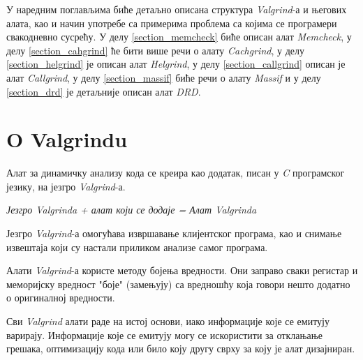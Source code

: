 \documentclass[12pt,oneside]{memoir}
\begin{document}
\indent У наредним поглављима биће детаљно описана структура \textit{Valgrind}-а и његових алата, као и начин употребе са примерима проблема са којима се програмери свакодневно сусрећу. У делу \ref{section_memcheck} биће описан алат \textit{Memcheck}, у делу \ref{section_cahgrind} ће бити више речи о алату \textit{Cachgrind}, у делу \ref{section_helgrind} је описан алат \textit{Helgrind}, у делу \ref{section_callgrind} описан је алат \textit{Callgrind}, у делу \ref{section_massif} биће речи о алату \textit{Massif} и у делу \ref{section_drd} је детаљније описан алат \textit{DRD}.

\section{O Valgrindu}

\indent Алат за динамичку анализу кода се креира као додатак, писан у \textit{C} програмског језику, на језгро \textit{Valgrind}-а. 


\begin{center}
\textit{Језгро Valgrinda + алат који се додаје = Алат Valgrinda} 
\end{center}


\indent Језгро \textit{Valgrind}-а омогућава извршавање клијентског програма, као и снимање извештаја који су настали приликом анализе самог програма. 

\indent Алати \textit{Valgrind}-а користе методу бојења вредности. Они заправо сваки регистар и меморијску вредност "боје" (замењују) са вредношћу која говори нешто додатно о оригиналној вредности. 

\indent Сви \textit{Valgrind} алати раде на истој основи, иако информације које се емитују варирају. Информације које се емитују могу се искористити за отклањање грешака, оптимизацију кода или било коју другу сврху за коју је алат дизајниран.
\end{document}
